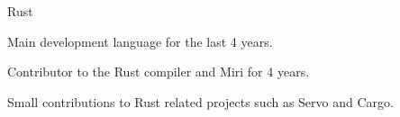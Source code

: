 


\begin{cvskills}


\cvskill
{Rust} %
{
    \begin{cvitems}
    \item Main development language for the last 4 years.
    \item Contributor to the Rust compiler and Miri for 4 years.
    \item Small contributions to Rust related projects such as Servo and Cargo.
    \end{cvitems}
}



\end{cvskills}
